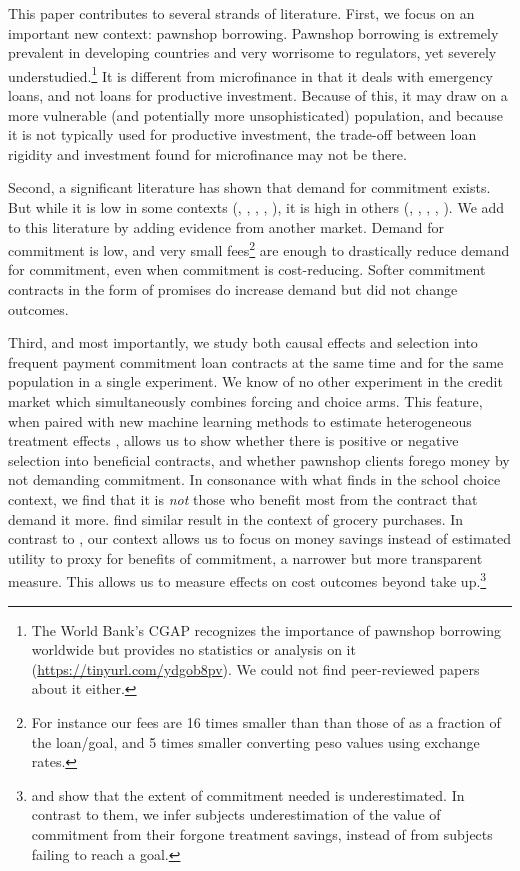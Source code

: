 \documentclass[oneside,11pt]{article}
\begin{document}
This paper contributes to several strands of literature. First, we focus on an important new context: pawnshop borrowing. Pawnshop borrowing is extremely prevalent in developing countries and very worrisome to regulators, yet severely understudied.\footnote{The World Bank's CGAP recognizes the importance of pawnshop borrowing worldwide but provides no statistics or analysis on it (\url{https://tinyurl.com/ydgob8pv}). We could not find peer-reviewed papers about it either.} It is different from microfinance in that it deals with emergency loans, and not loans for productive investment. Because of this, it may draw on a more vulnerable (and potentially more unsophisticated) population, and because it is not typically used for productive investment, the trade-off between loan rigidity and investment found for microfinance \citep{Field} may not be there. 

Second, a significant literature has shown that demand for commitment exists. But while it is low in some contexts (\cite{Ashraf}, \cite{Gine}, \cite{Ted}, \cite{Royer}, \cite{Sprenger}), it is high in others (\cite{Kremer},  \cite{Casaburi}, \cite{Alcohol}, \cite{AprajitP&P}, \cite{Pascaline}). We add to this literature by adding evidence from another market. Demand for commitment  is low, and very small fees\footnote{For instance our fees are 16 times smaller than than those of \cite{John} as a fraction of the loan/goal, and 5 times smaller converting peso values using exchange rates.} are enough to drastically reduce demand for commitment, even when commitment is cost-reducing. Softer commitment contracts in the form of promises do increase demand but did not change outcomes. %

Third, and most importantly, we study both causal effects and selection into frequent payment commitment loan contracts at the same time and for the same population in a single experiment. We know of no other experiment in the credit market which simultaneously combines forcing and choice arms. This feature, when paired with new machine learning methods to estimate heterogeneous treatment effects \citep{atheygrf}, allows us to show whether there is positive or negative selection into beneficial contracts, and whether pawnshop clients forego money by not demanding commitment. In consonance with what \cite{Walters} finds in the school choice context, we find that it is \textit{not} those who benefit most from the contract that demand it more.  \cite{Sprenger} find similar result in the context of grocery purchases. In contrast to \cite{Sprenger}, our context allows us to focus on money savings instead of estimated utility to proxy for benefits of commitment, a narrower but more transparent measure. This allows us to measure effects on cost outcomes beyond take up.\footnote{\cite{John} and \cite{Ted} show that the extent of commitment needed is underestimated. In contrast to them, we infer subjects underestimation of the value of commitment from their forgone treatment savings, instead of from subjects failing to reach a goal.} 
\end{document}
